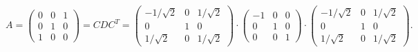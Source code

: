 \documentclass{article}
\begin{document}
$$A=\left(\begin{array}{rrr}0 & 0 & 1\\0 & 1 & 0\\1 & 0 & 0\end{array}\right)=CDC^T=\left(\begin{array}{rrr}-1/\sqrt{2} & 0 & 1/\sqrt{2}\\0 & 1 & 0\\1/\sqrt{2} & 0 & 1/\sqrt{2}\end{array}\right)\cdot\left(\begin{array}{rrr}-1 & 0 & 0\\0 & 1 & 0\\0 & 0 & 1\end{array}\right)\cdot\left(\begin{array}{rrr}-1/\sqrt{2} & 0 & 1/\sqrt{2}\\0 & 1 & 0\\1/\sqrt{2} & 0 & 1/\sqrt{2}\end{array}\right).$$
\end{document}
